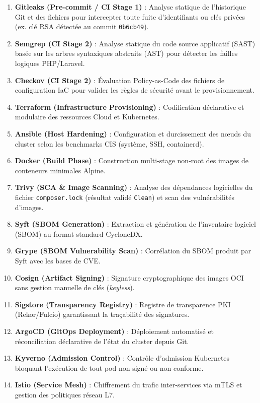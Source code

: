 \begin{enumerate}
    \item \textbf{Gitleaks (Pre-commit / CI Stage 1)} : Analyse statique de l'historique Git et des fichiers pour intercepter toute fuite d'identifiants ou clés privées (ex. clé RSA détectée au commit \texttt{0b6cb49}).
    \item \textbf{Semgrep (CI Stage 2)} : Analyse statique du code source applicatif (SAST) basée sur les arbres syntaxiques abstraits (AST) pour détecter les failles logiques PHP/Laravel.
    \item \textbf{Checkov (CI Stage 2)} : Évaluation Policy-as-Code des fichiers de configuration IaC pour valider les règles de sécurité avant le provisionnement.
    \item \textbf{Terraform (Infrastructure Provisioning)} : Codification déclarative et modulaire des ressources Cloud et Kubernetes.
    \item \textbf{Ansible (Host Hardening)} : Configuration et durcissement des nœuds du cluster selon les benchmarks CIS (système, SSH, containerd).
    \item \textbf{Docker (Build Phase)} : Construction multi-stage non-root des images de conteneurs minimales Alpine.
    \item \textbf{Trivy (SCA \& Image Scanning)} : Analyse des dépendances logicielles du fichier \texttt{composer.lock} (résultat validé \texttt{Clean}) et scan des vulnérabilités d'images.
    \item \textbf{Syft (SBOM Generation)} : Extraction et génération de l'inventaire logiciel (SBOM) au format standard CycloneDX.
    \item \textbf{Grype (SBOM Vulnerability Scan)} : Corrélation du SBOM produit par Syft avec les bases de CVE.
    \item \textbf{Cosign (Artifact Signing)} : Signature cryptographique des images OCI sans gestion manuelle de clés (\textit{keyless}).
    \item \textbf{Sigstore (Transparency Registry)} : Registre de transparence PKI (Rekor/Fulcio) garantissant la traçabilité des signatures.
    \item \textbf{ArgoCD (GitOps Deployment)} : Déploiement automatisé et réconciliation déclarative de l'état du cluster depuis Git.
    \item \textbf{Kyverno (Admission Control)} : Contrôle d'admission Kubernetes bloquant l'exécution de tout pod non signé ou non conforme.
    \item \textbf{Istio (Service Mesh)} : Chiffrement du trafic inter-services via mTLS et gestion des politiques réseau L7.

\end{enumerate}

